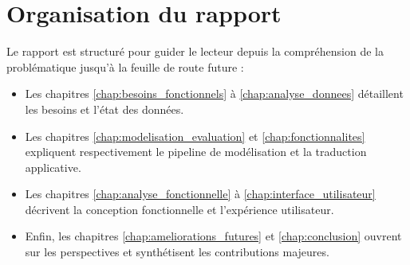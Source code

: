 \section{Organisation du rapport}
Le rapport est structuré pour guider le lecteur depuis la compréhension de la problématique jusqu'à la feuille de route future :
\begin{itemize}
    \item Les chapitres \ref{chap:besoins_fonctionnels} à \ref{chap:analyse_donnees} détaillent les besoins et l'état des données.
    \item Les chapitres \ref{chap:modelisation_evaluation} et \ref{chap:fonctionnalites} expliquent respectivement le pipeline de modélisation et la traduction applicative.
    \item Les chapitres \ref{chap:analyse_fonctionnelle} à \ref{chap:interface_utilisateur} décrivent la conception fonctionnelle et l'expérience utilisateur.
    \item Enfin, les chapitres \ref{chap:ameliorations_futures} et \ref{chap:conclusion} ouvrent sur les perspectives et synthétisent les contributions majeures.
\end{itemize}
